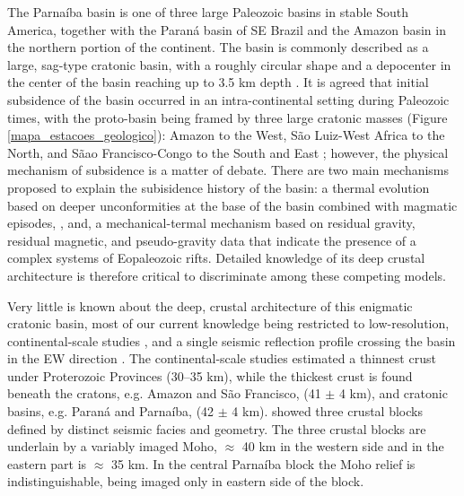 \documentclass[paper,11pt]{geophysics}
\begin{document}
The Parnaíba basin is one of three large Paleozoic basins in stable South America, together with the Paraná basin of SE Brazil and the Amazon basin in the northern portion of the continent. The basin is commonly described as a large, sag-type cratonic basin, with a roughly circular shape and a depocenter in the center of the basin reaching up to 3.5 km depth \citep{goes_feijo_1994,vaz_bacia_2007,daly_brasiliano_2014}. It is agreed that initial subsidence of the basin occurred in an intra-continental setting during Paleozoic times, with the proto-basin being framed by three large cratonic masses (Figure \ref{mapa_estacoes_geologico}): Amazon to the West, São Luiz-West Africa to the North, and Sãao Francisco-Congo to the South and East \citep{de_almeida_brazilian_1981,de_brito_neves_influence_1984,cordani_bacia_2009,de_brito_neves_neoproterozoic_2013,cordani_significance_2013}; however, the physical mechanism of subsidence is a matter of debate. There are two main mechanisms proposed to explain the subisidence history of the basin: a thermal evolution based on deeper unconformities at the base of the basin combined with magmatic episodes, \citep{daly_brasiliano_2014}, and, a mechanical-termal mechanism based on residual gravity, residual magnetic, and pseudo-gravity data that indicate the presence of a complex systems of Eopaleozoic rifts.  Detailed knowledge of its deep crustal architecture is therefore critical to discriminate among these competing models.

Very little is known about the deep, crustal architecture of this enigmatic cratonic basin, most of our current knowledge being restricted to low-resolution, continental-scale studies \citep{feng_group_velocity_2004,feng_upper_2007,lloyd_moho_2010,van_der_meijde_gravity_2013,assumpcao_models_2013,assumpcao_crustal_2013,uieda_fast_2017}, and a single seismic reflection profile crossing the basin in the EW direction \citep{daly_brasiliano_2014}. The continental-scale studies estimated a 
thinnest crust under Proterozoic Provinces (30–35 km), while the thickest crust is found beneath the cratons, e.g. Amazon and São Francisco, (41 $\pm$ 4 km), and cratonic basins, e.g. Paraná and Parnaíba, (42 $\pm$ 4 km). \citep{daly_brasiliano_2014} showed three crustal blocks defined by distinct seismic facies and geometry. The three crustal blocks are underlain by a variably imaged Moho, $\approx$ 40 km in the western side and in the eastern part is $\approx$ 35 km. In the central Parnaíba block the Moho relief is indistinguishable, being imaged only in eastern side of the block.
\end{document}
